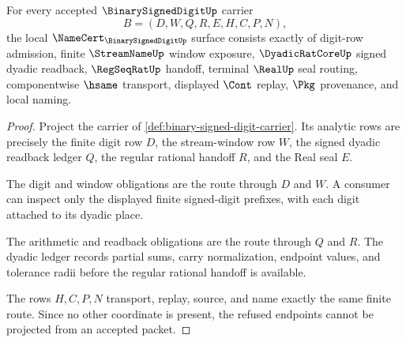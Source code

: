 \begin{theorem}
\label{thm:binary-signed-digit-namecert-obligations}
For every accepted $\BinarySignedDigitUp$ carrier
$$
B=(D,W,Q,R,E,H,C,P,N),
$$
the local $\NameCert_{\BinarySignedDigitUp}$ surface consists exactly of digit-row admission, finite $\StreamNameUp$ window exposure, $\DyadicRatCoreUp$ signed dyadic readback, $\RegSeqRatUp$ handoff, terminal $\RealUp$ seal routing, componentwise $\hsame$ transport, displayed $\Cont$ replay, $\Pkg$ provenance, and local naming.
\end{theorem}
\begin{proof}
Project the carrier of \autoref{def:binary-signed-digit-carrier}. Its analytic rows are precisely the finite digit row $D$, the stream-window row $W$, the signed dyadic readback ledger $Q$, the regular rational handoff $R$, and the Real seal $E$.

The digit and window obligations are the route through $D$ and $W$. A consumer can inspect only the displayed finite signed-digit prefixes, with each digit attached to its dyadic place.

The arithmetic and readback obligations are the route through $Q$ and $R$. The dyadic ledger records partial sums, carry normalization, endpoint values, and tolerance radii before the regular rational handoff is available.

The rows $H,C,P,N$ transport, replay, source, and name exactly the same finite route. Since no other coordinate is present, the refused endpoints cannot be projected from an accepted packet.
\end{proof}

